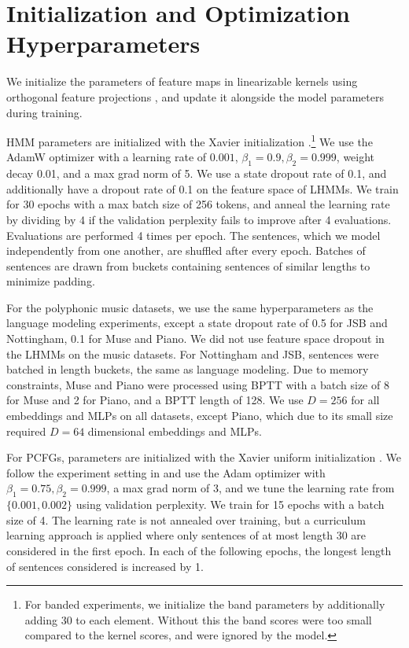 \documentclass{article}
\begin{document}
\section{\label{sec:opt}Initialization and Optimization Hyperparameters}
We initialize the parameters of feature maps in linearizable kernels using orthogonal feature projections \citep{choromanski2020performer}, and update it alongside the model parameters during training.

HMM parameters are initialized with the Xavier initialization \citep{glorot2010understanding}.\footnote{
For banded experiments, we initialize the band parameters by additionally adding 30 to each element.
Without this the band scores were too small compared to the kernel scores, and were ignored by the model.
}
We use the AdamW \citep{adamw} optimizer with a learning rate of $0.001$, $\beta_1=0.9,\beta_2=0.999$, weight decay 0.01, and a max grad norm of 5.
We use a state dropout rate of 0.1, and additionally have a dropout rate of 0.1 on the feature space of LHMMs.
We train for 30 epochs with a max batch size of 256 tokens, and anneal the learning rate by dividing by 4 if the validation perplexity fails to improve after 4 evaluations. Evaluations are performed 4 times per epoch.
The sentences, which we model independently from one another, are shuffled after every epoch.
Batches of sentences are drawn from buckets containing sentences of similar lengths to minimize padding. 

For the polyphonic music datasets, we use the same hyperparameters as the language modeling experiments, except a state dropout rate of 0.5 for JSB and Nottingham, 0.1 for Muse and Piano. We did not use feature space dropout in the LHMMs on the music datasets. For Nottingham and JSB, sentences were batched in length buckets, the same as language modeling. Due to memory constraints, Muse and Piano were processed using BPTT with a batch size of 8 for Muse and 2 for Piano, and a BPTT length of 128. We use $D=256$ for all embeddings and MLPs on all datasets, except Piano, which due to its small size required $D=64$ dimensional embeddings and MLPs. %

For PCFGs, parameters are initialized with the Xavier uniform initialization \citep{glorot2010understanding}.
We follow the experiment setting in \citet{kim2019cpcfg} and use the Adam \citep{kingma2017adam} optimizer with $\beta_1=0.75,\beta_2=0.999$, a max grad norm of 3, and we tune the learning rate from $\{0.001, 0.002\}$ using validation perplexity. We train for 15 epochs with a batch size of 4. The learning rate is not annealed over training, but a curriculum learning approach is applied where only sentences of at most length 30 are considered in the first epoch. In each of the following epochs, the longest length of sentences considered is increased by 1.
\end{document}
